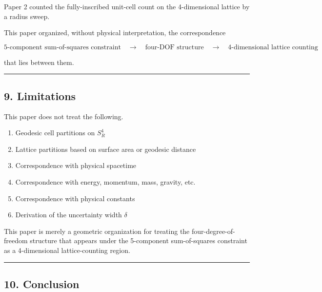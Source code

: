 \documentclass[
]{article}
\providecommand{\tightlist}{%
  \setlength{\itemsep}{0pt}\setlength{\parskip}{0pt}}
\begin{document}
Paper 2 counted the fully-inscribed unit-cell count on the 4-dimensional
lattice by a radius sweep.

This paper organized, without physical interpretation, the
correspondence

\[
\text{5-component sum-of-squares constraint}
\quad\longrightarrow\quad
\text{four-DOF structure}
\quad\longrightarrow\quad
\text{4-dimensional lattice counting}
\]

that lies between them.

\begin{center}\rule{0.5\linewidth}{0.5pt}\end{center}

\subsection{9. Limitations}\label{limitations}

This paper does not treat the following.

\begin{enumerate}
\def\labelenumi{\arabic{enumi}.}
\tightlist
\item
  Geodesic cell partitions on \(S^4_R\)\\
\item
  Lattice partitions based on surface area or geodesic distance\\
\item
  Correspondence with physical spacetime\\
\item
  Correspondence with energy, momentum, mass, gravity, etc.\\
\item
  Correspondence with physical constants\\
\item
  Derivation of the uncertainty width \(\delta\)
\end{enumerate}

This paper is merely a geometric organization for treating the
four-degree-of-freedom structure that appears under the 5-component
sum-of-squares constraint as a 4-dimensional lattice-counting region.

\begin{center}\rule{0.5\linewidth}{0.5pt}\end{center}

\subsection{10. Conclusion}\label{conclusion}
\end{document}
